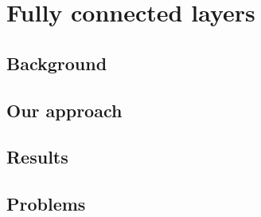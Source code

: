 \chapter{Fully connected layers}

\section{Background}

\section{Our approach}

\section{Results}

\section{Problems}